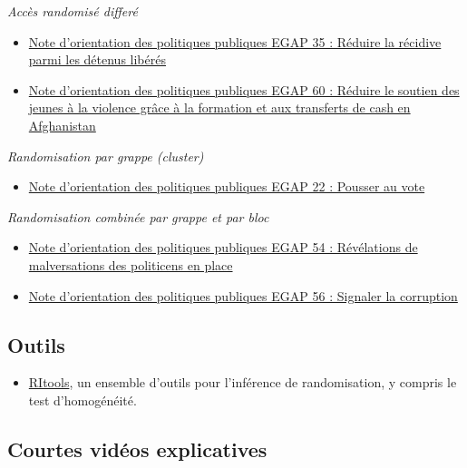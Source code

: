 \documentclass[
  12pt,
]{book}
\providecommand{\tightlist}{%
  \setlength{\itemsep}{0pt}\setlength{\parskip}{0pt}}
\begin{document}
\emph{Accès randomisé differé}

\begin{itemize}
\item
  \href{https://egap.org/resource/brief-35-reducing-reconvictions-among-released-prisoners/}{Note d'orientation des politiques publiques EGAP 35 : Réduire la récidive parmi les détenus libérés}
\item
  \href{https://egap.org/resource/reducing-youth-support-for-violence-through-training-and-cash-transfers-in-afghanistan/}{Note d'orientation des politiques publiques EGAP 60 : Réduire le soutien des jeunes à la violence grâce à la formation et aux transferts de cash en Afghanistan}
\end{itemize}

\emph{Randomisation par grappe (cluster)}

\begin{itemize}
\tightlist
\item
  \href{https://egap.org/resource/brief-22-getting-out-the-vote/}{Note d'orientation des politiques publiques EGAP 22 : Pousser au vote}
\end{itemize}

\emph{Randomisation combinée par grappe et par bloc}

\begin{itemize}
\item
  \href{https://egap.org/resource/evidence-from-mexico-the-effect-of-incumbent-malfeasance-revelations/}{Note d'orientation des politiques publiques EGAP 54 : Révélations de malversations des politicens en place}
\item
  \href{https://egap.org/resource/reporting-corruption-in-nigeria-testing-the-effects-of-norms-nudges/}{Note d'orientation des politiques publiques EGAP 56 : Signaler la corruption}
\end{itemize}

\hypertarget{outils-1}{%
\subsection{Outils}\label{outils-1}}

\begin{itemize}
\tightlist
\item
  \href{https://cran.r-project.org/web/packages/RItools/index.html}{RItools}, un ensemble d'outils pour l'inférence de randomisation, y compris le test d'homogénéité.
\end{itemize}

\hypertarget{courtes-viduxe9os-explicatives}{%
\subsection{Courtes vidéos explicatives}\label{courtes-viduxe9os-explicatives}}
\end{document}
